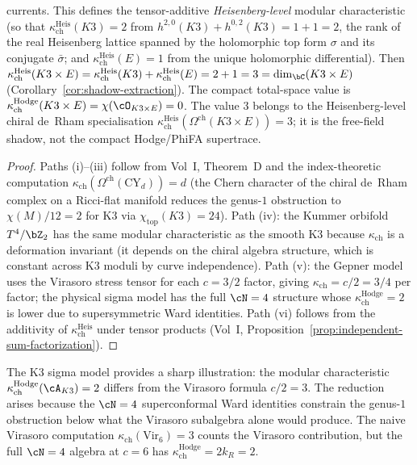 \begin{proposition}
\begin{enumerate}[label=\textup{(\roman*)}]
 currents. This defines the tensor-additive
 \emph{Heisenberg-level} modular characteristic
 \textup{(}so that $\kappa_{\mathrm{ch}}^{\mathrm{Heis}}(K3) = 2$
 from $h^{2,0}(K3) + h^{0,2}(K3) = 1 + 1 = 2$, the rank of the
 real Heisenberg lattice spanned by the holomorphic top form
 $\sigma$ and its conjugate $\bar\sigma$; and
 $\kappa_{\mathrm{ch}}^{\mathrm{Heis}}(E) = 1$ from the unique
 holomorphic differential\textup{)}. Then
 $\kappa_{\mathrm{ch}}^{\mathrm{Heis}}(K3 \times E) =
 \kappa_{\mathrm{ch}}^{\mathrm{Heis}}(K3) + \kappa_{\mathrm{ch}}^{\mathrm{Heis}}(E) = 2 + 1 = 3 = \dim_\bC(K3 \times E)$
 \textup{(}Corollary~\textup{\ref{cor:shadow-extraction})}.
 The compact total-space value is
 $\kappa_{\mathrm{ch}}^{\mathrm{Hodge}}(K3\times E)=\chi(\cO_{K3\times E})=0$.
 The value $3$ belongs to the Heisenberg-level chiral de~Rham
 specialisation
 $\kappa_{\mathrm{ch}}^{\mathrm{Heis}}(\Omega^{\mathrm{ch}}(K3 \times E))=3$;
 it is the free-field shadow, not the compact Hodge/PhiFA
 supertrace\textup{.}
\end{enumerate}
\end{proposition}

\begin{proof}
Paths (i)--(iii) follow from Vol~I, Theorem~D and the index-theoretic
computation $\kappa_{\mathrm{ch}}(\Omega^{\mathrm{ch}}(\mathrm{CY}_d)) = d$
(the Chern character of the chiral de~Rham complex on a Ricci-flat
manifold reduces the genus-$1$ obstruction to $\chi(M)/12 = 2$
for K3 via $\chi_{\mathrm{top}}(K3) = 24$). Path (iv): the Kummer orbifold
$T^4/\bZ_2$ has the same modular characteristic as the smooth K3
because $\kappa_{\mathrm{ch}}$ is a deformation invariant (it depends on the
chiral algebra structure, which is constant across K3 moduli by
curve independence). Path (v): the Gepner model uses the Virasoro
stress tensor for each $c = 3/2$ factor, giving $\kappa_{\mathrm{ch}} = c/2 = 3/4$
per factor; the physical sigma model has the full $\cN = 4$
structure whose $\kappa_{\mathrm{ch}}^{\mathrm{Hodge}} = 2$ is lower due to supersymmetric
Ward identities. Path (vi) follows from the additivity of
$\kappa_{\mathrm{ch}}^{\mathrm{Heis}}$ under tensor products
(Vol~I, Proposition~\ref{prop:independent-sum-factorization}).
\end{proof}

\begin{remark}[\texorpdfstring{$\kappa_{\mathrm{ch}}^{\mathrm{Hodge}}(K3) = 2 \neq c/2 = 3$}{kappa-ch(K3) = 2 != c/2 = 3}: modular characteristic vs central charge]
\label{rem:kappa-k3-vs-central-charge}
The K3 sigma model provides a sharp illustration: the
modular characteristic $\kappa_{\mathrm{ch}}^{\mathrm{Hodge}}(\cA_{K3}) = 2$ differs from the
Virasoro formula $c/2 = 3$. The reduction arises because the
$\cN = 4$ superconformal Ward identities constrain the genus-$1$
obstruction below what the Virasoro subalgebra alone would produce.
The naive Virasoro computation $\kappa_{\mathrm{ch}}(\mathrm{Vir}_6) = 3$ counts
the Virasoro contribution, but the full $\cN = 4$ algebra at $c = 6$
has $\kappa_{\mathrm{ch}}^{\mathrm{Hodge}} = 2k_R = 2$.
\end{remark}


